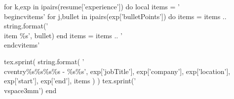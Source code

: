 

\begin{cventries}




\begin{luacode}
  for k,exp in ipairs(resume['experience']) do
    local items = '\\begin{cvitems}'
    for j,bullet in ipairs(exp['bulletPoints']) do
    items = items .. string.format('\\item {\%s}', bullet)
    end
    items = items .. '\\end{cvitems}'

    tex.sprint(
      string.format(
        '\\cventry{\%s}{\%s}{\%s}{\%s - \%s}{\%s}',
        exp['jobTitle'],
        exp['company'],
        exp['location'],
        exp['start'],
        exp['end'],
        items
      )
    )
    tex.sprint('\\vspace{3mm}')
  end
\end{luacode}


\end{cventries}
